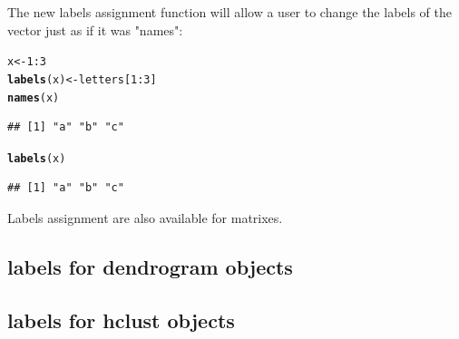 \documentclass[shortnames,nojss,article]{jss}\usepackage{graphicx, color}
\makeatletter
\newcommand{\hlfunctioncall}[1]{\textcolor[rgb]{0.501960784313725,0,0.329411764705882}{\textbf{#1}}}%
\newenvironment{kframe}{%
 \def\at@end@of@kframe{}%
 \ifinner\ifhmode%
  \def\at@end@of@kframe{\end{minipage}}%
  \begin{minipage}{\columnwidth}%
 \fi\fi%
 \def\FrameCommand##1{\hskip\@totalleftmargin \hskip-\fboxsep
 \colorbox{shadecolor}{##1}\hskip-\fboxsep
     \hskip-\linewidth \hskip-\@totalleftmargin \hskip\columnwidth}%
 \MakeFramed {\advance\hsize-\width
   \@totalleftmargin\z@ \linewidth\hsize
   \@setminipage}}%
 {\par\unskip\endMakeFramed%
 \at@end@of@kframe}
\newenvironment{knitrout}{}{} %
\makeatother
\begin{document}
The new labels assignment function will allow a user to change the labels of the vector just as if it was "names":

\begin{knitrout}
\color{fgcolor}\begin{kframe}
\begin{alltt}
x <- 1:3
\hlfunctioncall{labels}(x) <- letters[1:3]
\hlfunctioncall{names}(x)
\end{alltt}
\begin{verbatim}
## [1] "a" "b" "c"
\end{verbatim}
\begin{alltt}
\hlfunctioncall{labels}(x)
\end{alltt}
\begin{verbatim}
## [1] "a" "b" "c"
\end{verbatim}
\end{kframe}
\end{knitrout}


Labels assignment are also available for matrixes.


\subsection{labels for dendrogram objects}

\subsection{labels for hclust objects}




% 
% 
% 
% 
% 
%   
%   
% 
% 
\end{document}
